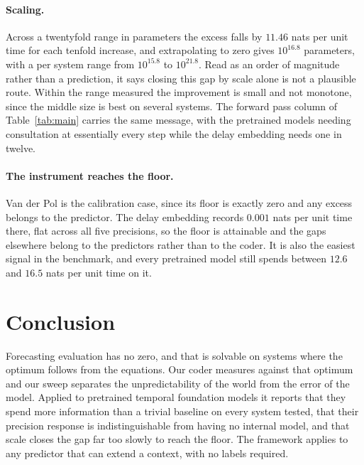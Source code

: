 \documentclass{article}
\begin{document}
\paragraph{Scaling.}
Across a twentyfold range in parameters the excess falls by $11.46$ nats per unit time for each tenfold increase, and extrapolating to zero gives $10^{16.8}$ parameters, with a per system range from $10^{15.8}$ to $10^{21.8}$. Read as an order of magnitude rather than a prediction, it says closing this gap by scale alone is not a plausible route. Within the range measured the improvement is small and not monotone, since the middle size is best on several systems. The forward pass column of Table~\ref{tab:main} carries the same message, with the pretrained models needing consultation at essentially every step while the delay embedding needs one in twelve.

\paragraph{The instrument reaches the floor.}
Van der Pol is the calibration case, since its floor is exactly zero and any excess belongs to the predictor. The delay embedding records $0.001$ nats per unit time there, flat across all five precisions, so the floor is attainable and the gaps elsewhere belong to the predictors rather than to the coder. It is also the easiest signal in the benchmark, and every pretrained model still spends between $12.6$ and $16.5$ nats per unit time on it.

\section{Conclusion}

Forecasting evaluation has no zero, and that is solvable on systems where the optimum follows from the equations. Our coder measures against that optimum and our sweep separates the unpredictability of the world from the error of the model. Applied to pretrained temporal foundation models it reports that they spend more information than a trivial baseline on every system tested, that their precision response is indistinguishable from having no internal model, and that scale closes the gap far too slowly to reach the floor. The framework applies to any predictor that can extend a context, with no labels required.

\nocite{*}



\newpage
\appendix
\end{document}
